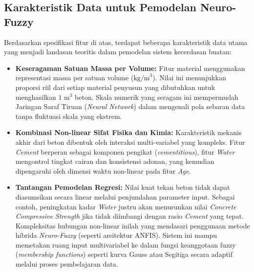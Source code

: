 \subsection{Karakteristik Data untuk Pemodelan Neuro-Fuzzy}
Berdasarkan spesifikasi fitur di atas, terdapat beberapa karakteristik data utama yang menjadi landasan teoritis dalam pemodelan sistem kecerdasan buatan:

\begin{itemize}
    \item \textbf{Keseragaman Satuan Massa per Volume:} Fitur material menggunakan representasi massa per satuan volume ($\text{kg/m}^3$). 
    Nilai ini menunjukkan proporsi riil dari setiap material penyusun yang dibutuhkan untuk menghasilkan $1\text{ m}^3$ beton. 
    Skala numerik yang seragam ini mempermudah Jaringan Saraf Tiruan (\textit{Neural Network}) dalam mengenali pola sebaran data tanpa fluktuasi skala yang ekstrem.
    \item \textbf{Kombinasi Non-linear Sifat Fisika dan Kimia:} Karakteristik mekanis akhir dari beton dibentuk oleh interaksi multi-variabel yang kompleks. 
    Fitur \textit{Cement} berperan sebagai komponen pengikat (\textit{cementitious}), fitur \textit{Water} mengontrol tingkat cairan dan konsistensi adonan, yang kemudian dipengaruhi oleh dimensi waktu non-linear pada fitur \textit{Age}.
    \item \textbf{Tantangan Pemodelan Regresi:} Nilai ku\-at te\-kan be\-ton ti\-dak da\-pat di\-asum\-si\-kan secara linear melalui penjumlahan para\-me\-ter in\-put. 
    Sebagai contoh, peningkatan kadar \textit{Water} justru akan menurunkan nilai \textit{Concrete Compressive Strength} jika tidak diimbangi dengan rasio \textit{Cement} yang tepat. 
    Kompleksitas hubungan non-linear inilah yang mendasari penggunaan metode hibrida \textit{Neuro-Fuzzy} (seperti arsitektur ANFIS). 
    Sistem ini mampu memetakan ruang input multivariabel ke dalam fungsi keanggotaan fuzzy (\textit{membership functions}) seperti kurva Gauss atau Segitiga secara adaptif melalui proses pembelajaran data.
\end{itemize}